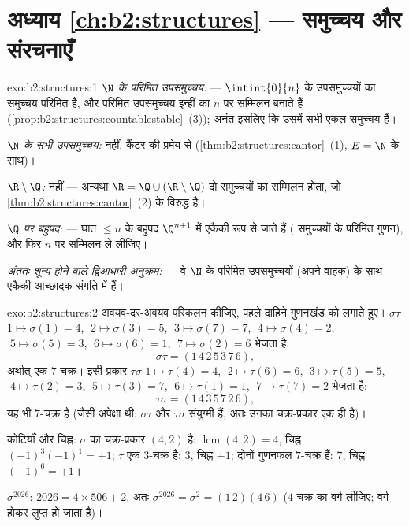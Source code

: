 \section*{अध्याय \ref{ch:b2:structures} --- समुच्चय और संरचनाएँ}

\begin{solution}{exo:b2:structures:1}
\emph{$\N$ के परिमित उपसमुच्चय:}  --- $\intint{0}{n}$ के उपसमुच्चयों का
समुच्चय परिमित है, और परिमित उपसमुच्चय इन्हीं का $n$ पर  सम्मिलन
बनाते हैं (\cref{prop:b2:structures:countablestable}~(3)); अनंत इसलिए कि उसमें सभी एकल समुच्चय हैं।

\emph{$\N$ के सभी उपसमुच्चय:}  नहीं, कैंटर की प्रमेय से (\cref{thm:b2:structures:cantor}~(1),
$E = \N$ के साथ)।

\emph{$\R \setminus \Q$:}  नहीं --- अन्यथा $\R = \Q \cup
(\R\setminus\Q)$ दो  समुच्चयों का सम्मिलन
होता, जो \cref{thm:b2:structures:cantor}~(2) के विरुद्ध है।

\emph{$\Q$ पर बहुपद:}  --- घात $\leq n$ के बहुपद $\Q^{n+1}$ में एकैकी रूप से
जाते हैं ( समुच्चयों के परिमित गुणन), और फिर $n$ पर सम्मिलन ले
लीजिए।

\emph{अंततः शून्य होने वाले द्विआधारी अनुक्रम:}  --- वे $\N$ के
परिमित उपसमुच्चयों (अपने वाहक) के साथ एकैकी आच्छादक संगति में हैं।
\end{solution}

\begin{solution}{exo:b2:structures:2}
अवयव-दर-अवयव परिकलन कीजिए, पहले दाहिने गुणनखंड को लगाते हुए। $\sigma\tau$ $1 \mapsto \sigma(1) = 4$,
$\;2 \mapsto \sigma(3)
= 5$, $\;3 \mapsto \sigma(7) = 7$, $\;4 \mapsto \sigma(4) = 2$, $\;5
\mapsto \sigma(5) = 3$, $\;6 \mapsto \sigma(6) = 1$, $\;7 \mapsto
\sigma(2) = 6$ भेजता है:
\[
\sigma\tau = (1\,4\,2\,5\,3\,7\,6),
\]
अर्थात् एक $7$-चक्र। इसी प्रकार $\tau\sigma$ $1 \mapsto \tau(4) = 4$, $\;2 \mapsto \tau(6) = 6$, $\;3 \mapsto \tau(5) = 5$, $\;4 \mapsto
\tau(2) = 3$, $\;5 \mapsto \tau(3) = 7$,
$\;6 \mapsto \tau(1) = 1$, $\;7 \mapsto \tau(7) = 2$ भेजता है:
\[
\tau\sigma = (1\,4\,3\,5\,7\,2\,6),
\]
यह भी $7$-चक्र है (जैसी अपेक्षा थी: $\sigma\tau$ और $\tau\sigma$ संयुग्मी हैं, अतः
उनका चक्र-प्रकार एक ही है)।

कोटियाँ और चिह्न: $\sigma$ का चक्र-प्रकार $(4,2)$ है:  $\operatorname{lcm}(4,2) = 4$, चिह्न $(-1)^3(-1)^1 = +1$; $\tau$
एक $3$-चक्र है:  $3$, चिह्न $+1$; दोनों गुणनफल $7$-चक्र हैं: 
$7$, चिह्न $(-1)^6 = +1$।

$\sigma^{2026}$: $2026 = 4 \times 506 + 2$, अतः $\sigma^{2026} =
\sigma^2 = (1\,2)(4\,6)$ ($4$-चक्र का वर्ग लीजिए;  वर्ग होकर लुप्त हो
जाता है)।
\end{solution}

